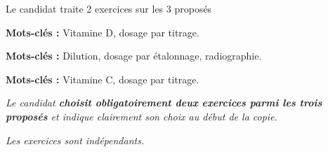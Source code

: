 \newpage
\vAligne{-50pt}

\begin{boite}
  \centering
  Le candidat traite  2 exercices sur les 3 proposés

  \begin{multicols}{3}
    \begin{boite}
      \begin{center}
      \end{center}
      \vspace*{-12pt}
      \textbf{Mots-clés :} Vitamine D, dosage par titrage.
    \end{boite}
    \begin{boite}
      \begin{center}
      \end{center}
      \vspace*{-12pt}
      \textbf{Mots-clés :} Dilution, dosage par étalonnage, radiographie.
    \end{boite}
    \begin{boite}
      \begin{center}
      \end{center}
      \vspace*{-12pt}
      \textbf{Mots-clés :} Vitamine C, dosage par titrage.
    \end{boite}
  \end{multicols}
\end{boite}

\textit{
  Le candidat \textbf{choisit obligatoirement deux exercices parmi les trois proposés} et indique clairement son choix au début de la copie.
}
 
\textit{
  Les exercices sont indépendants.
}
\vspace*{24pt}


\bigskip


\bigskip


\correction{\bigskip}
\pasCorrection{\newpage}


% 

\pasCorrection{\newpage}
\annexe
\annexeVitamineC